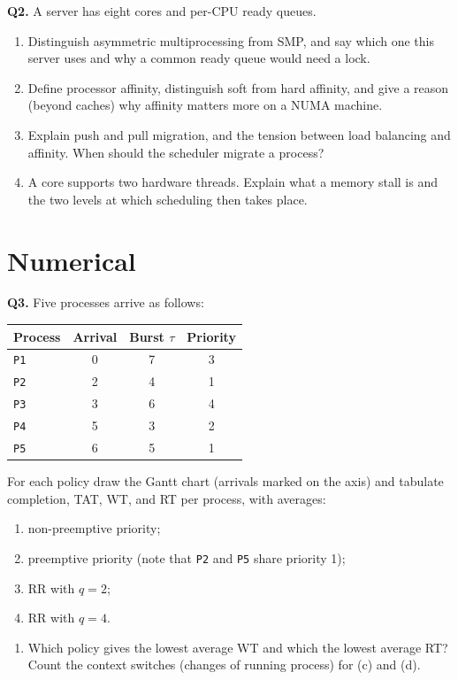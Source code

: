 \documentclass[11pt]{article}
\begin{document}
\textbf{Q2.} A server has eight cores and per-CPU ready queues.
\begin{enumerate}
  \item[(a)] Distinguish asymmetric multiprocessing from SMP, and say which one this server uses and why a common ready queue would need a lock.
  \item[(b)] Define processor affinity, distinguish soft from hard affinity, and give a reason (beyond caches) why affinity matters more on a NUMA machine.
  \item[(c)] Explain push and pull migration, and the tension between load balancing and affinity. When should the scheduler migrate a process?
  \item[(d)] A core supports two hardware threads. Explain what a memory stall is and the two levels at which scheduling then takes place.
\end{enumerate}

\section{Numerical}

\textbf{Q3.} Five processes arrive as follows:
\begin{center}
\begin{tabular}{lccc}
  Process & Arrival & Burst $\tau$ & Priority \\ \hline
  \texttt{P1} & 0 & 7 & 3 \\
  \texttt{P2} & 2 & 4 & 1 \\
  \texttt{P3} & 3 & 6 & 4 \\
  \texttt{P4} & 5 & 3 & 2 \\
  \texttt{P5} & 6 & 5 & 1 \\
\end{tabular}
\end{center}
For each policy draw the Gantt chart (arrivals marked on the axis) and tabulate completion, TAT, WT, and RT per process, with averages:
\begin{enumerate}
  \item[(a)] non-preemptive priority;
  \item[(b)] preemptive priority (note that \texttt{P2} and \texttt{P5} share priority 1);
  \item[(c)] RR with $q=2$;
  \item[(d)] RR with $q=4$.
\end{enumerate}
\begin{enumerate}
  \item[(e)] Which policy gives the lowest average WT and which the lowest average RT? Count the context switches (changes of running process) for (c) and (d).
\end{enumerate}
\end{document}
